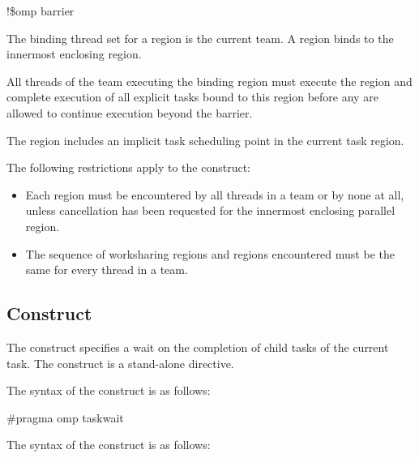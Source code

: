 \begin{boxedcode}
!\$omp barrier
\end{boxedcode}
\fortranspecificend

\binding
The binding thread set for a  region is the current team. A  region 
binds to the innermost enclosing  region. 

\descr
All threads of the team executing the binding  region must execute the 
 region and complete execution of all explicit tasks bound to this  
region before any are allowed to continue execution beyond the barrier.

The  region includes an implicit task scheduling point in the current task 
region.

\restrictions
The following restrictions apply to the  construct:

\begin{itemize}
\item Each  region must be encountered by all threads in a team or by none at all, 
unless cancellation has been requested for the innermost enclosing parallel region.

\item The sequence of worksharing regions and  regions encountered must be the 
same for every thread in a team.
\end{itemize}









\subsection{ Construct}
\label{subsec:taskwait Construct}
\summary
The  construct specifies a wait on the completion of child tasks of the 
current task. The  construct is a stand-alone directive.

\syntax
\ccppspecificstart
The syntax of the  construct is as follows:

\begin{boxedcode}
\#pragma omp taskwait 
\end{boxedcode}
\ccppspecificend

\fortranspecificstart
The syntax of the  construct is as follows:

